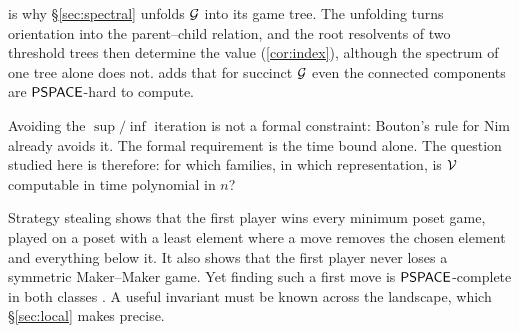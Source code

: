  is why \S\ref{sec:spectral} unfolds $\mathcal{G}$ into its game tree. The unfolding turns orientation into the parent--child relation, and the root resolvents of two threshold trees then determine the value (\cref{cor:index}), although the spectrum of one tree alone does not.  adds that for succinct $\mathcal{G}$ even the connected components are $\mathsf{PSPACE}$-hard to compute.

\begin{remark}\label{rem:bypass}
Avoiding the $\sup/\inf$ iteration is not a formal constraint: Bouton's rule for Nim already avoids it. The formal requirement is the time bound alone. The question studied here is therefore: for which families, in which representation, is $\mathcal{V}$ computable in time polynomial in $n$?
\end{remark}

\begin{remark}\label{rem:strategy-stealing}
Strategy stealing shows that the first player wins every minimum poset game, played on a poset with a least element where a move removes the chosen element and everything below it. It also shows that the first player never loses a symmetric Maker--Maker game. Yet finding such a first move is $\mathsf{PSPACE}$-complete in both classes \cite{BodwinGrossman}. A useful invariant must be known across the landscape, which \S\ref{sec:local} makes precise.
\end{remark}
